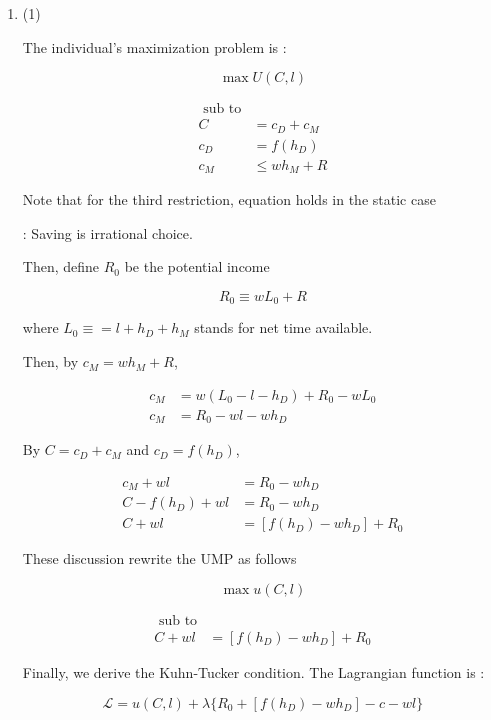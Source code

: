 \documentclass[dvipdfmx]{jsarticle}
\begin{document}
\begin{enumerate}
\begin{center}
 \end{center}
 
 \dotfill
 
 \item
 
 (1)
 
 The individual's maximization problem is :
 
 \[ \max U(C,l) \]
 
  \begin{align*}
  \text{ sub to} \\
  C &= c_D + c_M \\
  c_D &= f(h_D) \\
  c_M & \leq w h_M + R
  \end{align*}
 
 Note that for the third restriction, equation holds in the static case
 
 : Saving is irrational choice.
 
 Then, define $R_0$ be the potential income
 
 \[R_0 \equiv w L_0 + R \]
 
 where $L_0 \equiv = l + h_D + h_M$ stands for net time available.
 
 Then, by $c_M = w h_M + R$, 
 
  \begin{align*}
  c_M &= w (L_0 - l - h_D) + R_0 - w L_0 \\
  c_M &= R_0 - wl - wh_D
  \end{align*}
 
 By $C = c_D + c_M$ and $c_D = f(h_D)$,
 
  \begin{align*}
  c_M + wl &= R_0 - w h_D \\
  C - f(h_D) + wl &= R_0 - w h_D \\
  C + wl &= [f(h_D) - w h_D] + R_0
  \end{align*}
 
 These discussion rewrite the UMP as follows
 
 \[\max u (C, l)\]
 
  \begin{align*}
  \text{ sub to} \\
  C + wl &= [f(h_D) - w h_D] + R_0
  \end{align*}
 
 Finally, we derive the Kuhn-Tucker condition. The Lagrangian function is :
 
 \[ \mathcal{L} = u(C,l) + \lambda \{ R_0 + [f(h_D) - w h_D] - c -wl \} \]
 

\end{enumerate}
\end{document}
